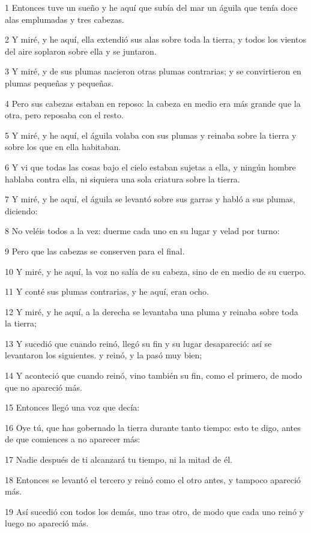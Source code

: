 \par 1 Entonces tuve un sueño y he aquí que subía del mar un águila que tenía doce alas emplumadas y tres cabezas.
\par 2 Y miré, y he aquí, ella extendió sus alas sobre toda la tierra, y todos los vientos del aire soplaron sobre ella y se juntaron.
\par 3 Y miré, y de sus plumas nacieron otras plumas contrarias; y se convirtieron en plumas pequeñas y pequeñas.
\par 4 Pero sus cabezas estaban en reposo: la cabeza en medio era más grande que la otra, pero reposaba con el resto.
\par 5 Y miré, y he aquí, el águila volaba con sus plumas y reinaba sobre la tierra y sobre los que en ella habitaban.
\par 6 Y vi que todas las cosas bajo el cielo estaban sujetas a ella, y ningún hombre hablaba contra ella, ni siquiera una sola criatura sobre la tierra.
\par 7 Y miré, y he aquí, el águila se levantó sobre sus garras y habló a sus plumas, diciendo:
\par 8 No veléis todos a la vez: duerme cada uno en su lugar y velad por turno:
\par 9 Pero que las cabezas se conserven para el final.
\par 10 Y miré, y he aquí, la voz no salía de su cabeza, sino de en medio de su cuerpo.
\par 11 Y conté sus plumas contrarias, y he aquí, eran ocho.
\par 12 Y miré, y he aquí, a la derecha se levantaba una pluma y reinaba sobre toda la tierra;
\par 13 Y sucedió que cuando reinó, llegó su fin y su lugar desapareció: así se levantaron los siguientes. y reinó, y la pasó muy bien;
\par 14 Y aconteció que cuando reinó, vino también su fin, como el primero, de modo que no apareció más.
\par 15 Entonces llegó una voz que decía:
\par 16 Oye tú, que has gobernado la tierra durante tanto tiempo: esto te digo, antes de que comiences a no aparecer más:
\par 17 Nadie después de ti alcanzará tu tiempo, ni la mitad de él.
\par 18 Entonces se levantó el tercero y reinó como el otro antes, y tampoco apareció más.
\par 19 Así sucedió con todos los demás, uno tras otro, de modo que cada uno reinó y luego no apareció más.
